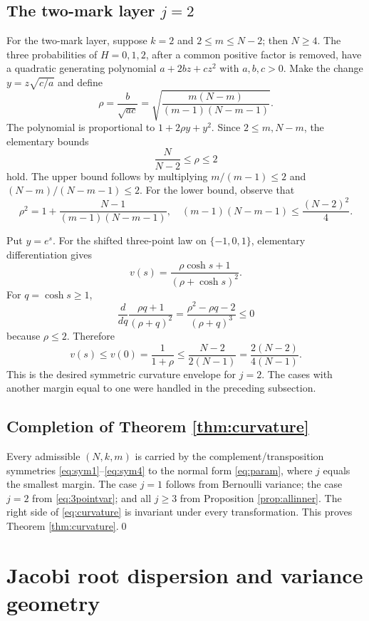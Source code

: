 \documentclass[11pt,a4paper]{article}
\begin{document}
\subsection{The two-mark layer \texorpdfstring{$j=2$}{j = 2}}
For the two-mark layer, suppose $k=2$ and $2\le m\le N-2$; then $N\ge4$. The three probabilities of $H=0,1,2$, after a common positive factor is removed, have a quadratic generating polynomial $a+2bz+cz^2$ with $a,b,c>0$. Make the change $y=z\sqrt{c/a}$ and define
\[
 \rho=\frac b{\sqrt{ac}}
 =\sqrt{\frac{m(N-m)}{(m-1)(N-m-1)}}.
\]
The polynomial is proportional to $1+2\rho y+y^2$. Since $2\le m,N-m$, the elementary bounds
\[
 \frac{N}{N-2}\le\rho\le2
\]
hold. The upper bound follows by multiplying $m/(m-1)\le2$ and $(N-m)/(N-m-1)\le2$. For the lower bound, observe that
\[
 \rho^2=1+\frac{N-1}{(m-1)(N-m-1)},
 \quad (m-1)(N-m-1)\le\frac{(N-2)^2}4.
\]

Put $y=e^s$. For the shifted three-point law on $\{-1,0,1\}$, elementary differentiation gives
\begin{equation}\label{eq:3pointvar}
 v(s)=\frac{\rho\cosh s+1}{(\rho+\cosh s)^2}.
\end{equation}
For $q=\cosh s\ge1$,
\[
 \frac{d}{dq}\frac{\rho q+1}{(\rho+q)^2}
 =\frac{\rho^2-\rho q-2}{(\rho+q)^3}\le0
\]
because $\rho\le2$. Therefore
\[
 v(s)\le v(0)=\frac1{1+\rho}
 \le\frac{N-2}{2(N-1)}=
 \frac{2(N-2)}{4(N-1)}.
\]
This is the desired symmetric curvature envelope for $j=2$. The cases with another margin equal to one were handled in the preceding subsection.

\subsection{Completion of Theorem \ref{thm:curvature}}
Every admissible $(N,k,m)$ is carried by the complement/transposition symmetries \eqref{eq:sym1}--\eqref{eq:sym4} to the normal form \eqref{eq:param}, where $j$ equals the smallest margin. The case $j=1$ follows from Bernoulli variance; the case $j=2$ from \eqref{eq:3pointvar}; and all $j\ge3$ from Proposition \ref{prop:allinner}. The right side of \eqref{eq:curvature} is invariant under every transformation. This proves Theorem \ref{thm:curvature}.\qed







\section{Jacobi root dispersion and variance geometry}\label{sec:structure}
\end{document}
